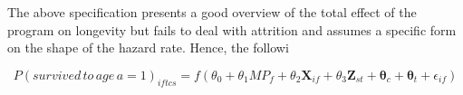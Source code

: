 The above specification presents a good overview of the total effect of the program on longevity but fails to deal with attrition and assumes a specific form on the shape of the hazard rate. Hence, the followi

$$
P(survived\,to\,age\,a=1)_{iftcs} = f(\theta_0 + \theta_1MP_f + \theta_2\mathbf{X}_{if} + \theta_3\mathbf{Z}_{st} + \mathbf{\theta}_c + \mathbf{\theta}_t + \epsilon_{if})
$$